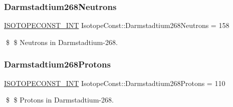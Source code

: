 \subsubsection{\texorpdfstring{Darmstadtium268\+Neutrons}{Darmstadtium268Neutrons}}
{\footnotesize\ttfamily \mbox{\hyperlink{group___isotope_const-_macros_ga5f18360b3e99483a35c32d789e62621c}{I\+S\+O\+T\+O\+P\+E\+C\+O\+N\+S\+T\+\_\+\+I\+NT}} Isotope\+Const\+::\+Darmstadtium268\+Neutrons = 158}

\$ \$ Neutrons in Darmstadtium-\/268. \mbox{\label{group___isotope_const-_darmstadtium-_ds268_ga7932a86962d295422cdf2a6105951e1b}} 
\subsubsection{\texorpdfstring{Darmstadtium268\+Protons}{Darmstadtium268Protons}}
{\footnotesize\ttfamily \mbox{\hyperlink{group___isotope_const-_macros_ga5f18360b3e99483a35c32d789e62621c}{I\+S\+O\+T\+O\+P\+E\+C\+O\+N\+S\+T\+\_\+\+I\+NT}} Isotope\+Const\+::\+Darmstadtium268\+Protons = 110}

\$ \$ Protons in Darmstadtium-\/268. 
